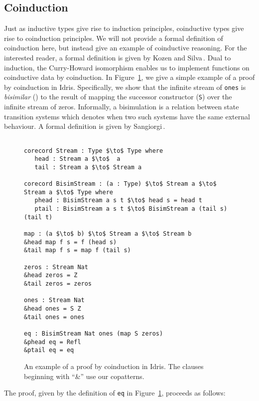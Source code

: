 \subsection{Coinduction}
Just as inductive types give rise to induction principles, coinductive types
give rise to coinduction principles. We will not provide a formal definition of
coinduction here, but instead give an example of coinductive reasoning. For the
interested reader, a formal definition is given by Kozen and
Silva\,\citep{Kozen2012}. Dual to induction, the Curry-Howard isomorphism
enables us to implement functions on coinductive data by coinduction. In
Figure~\ref{fig:proof_by_coinduction}, we give a simple example of a proof by
coinduction in Idris. Specifically, we show that the infinite stream of
\texttt{ones} is \emph{bisimilar} (\bisim) to the result of mapping the successor
constructor (\texttt{S}) over the infinite stream of zeros. Informally, a bisimulation is a relation between state transition
systems which denotes when two such systems have the same external behaviour. A
formal definition is given by Sangiorgi\,\citep[Section~1.4]{Sangiorgi2011}.
\begin{figure}[h]
\begin{lstlisting}[mathescape]
%default total

corecord Stream : Type $\to$ Type where
   head : Stream a $\to$  a
   tail : Stream a $\to$ Stream a
     
corecord BisimStream : (a : Type) $\to$ Stream a $\to$ Stream a $\to$ Type where
   phead : BisimStream a s t $\to$ head s = head t
   ptail : BisimStream a s t $\to$ BisimStream a (tail s) (tail t)

map : (a $\to$ b) $\to$ Stream a $\to$ Stream b
&head map f s = f (head s)
&tail map f s = map f (tail s)

zeros : Stream Nat
&head zeros = Z
&tail zeros = zeros

ones : Stream Nat
&head ones = S Z
&tail ones = ones

eq : BisimStream Nat ones (map S zeros)
&phead eq = Refl
&ptail eq = eq
\end{lstlisting}
  \caption{An example of a proof by coinduction in Idris. The clauses beginning
    with ``\&'' use our copatterns.}
\label{fig:proof_by_coinduction}
\end{figure}
The proof, given by the definition of \texttt{eq} in
Figure~\ref{fig:proof_by_coinduction}, proceeds as follows: 
